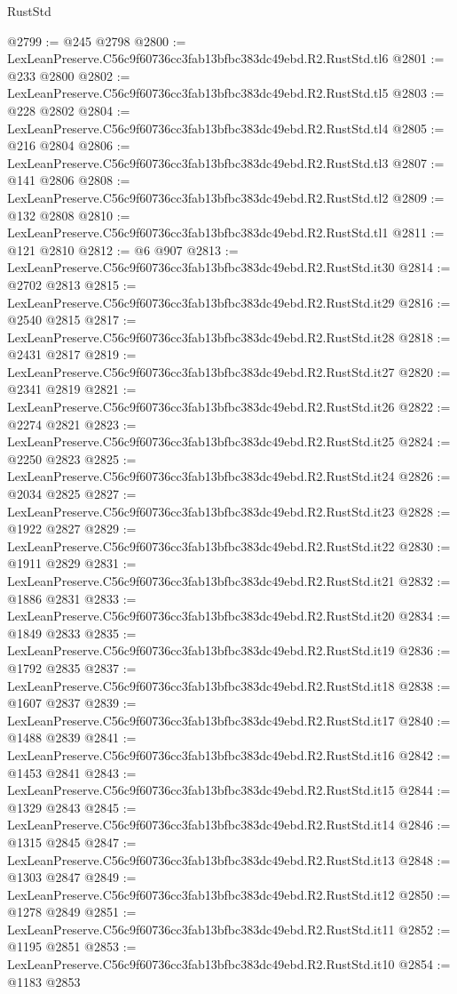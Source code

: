 \begin{lexlean}{RustStd}
\begin{coremodule}
@2799 := @245 @2798
@2800 := LexLeanPreserve.C56c9f60736cc3fab13bfbc383dc49ebd.R2.RustStd.tl6
@2801 := @233 @2800
@2802 := LexLeanPreserve.C56c9f60736cc3fab13bfbc383dc49ebd.R2.RustStd.tl5
@2803 := @228 @2802
@2804 := LexLeanPreserve.C56c9f60736cc3fab13bfbc383dc49ebd.R2.RustStd.tl4
@2805 := @216 @2804
@2806 := LexLeanPreserve.C56c9f60736cc3fab13bfbc383dc49ebd.R2.RustStd.tl3
@2807 := @141 @2806
@2808 := LexLeanPreserve.C56c9f60736cc3fab13bfbc383dc49ebd.R2.RustStd.tl2
@2809 := @132 @2808
@2810 := LexLeanPreserve.C56c9f60736cc3fab13bfbc383dc49ebd.R2.RustStd.tl1
@2811 := @121 @2810
@2812 := @6 @907
@2813 := LexLeanPreserve.C56c9f60736cc3fab13bfbc383dc49ebd.R2.RustStd.it30
@2814 := @2702 @2813
@2815 := LexLeanPreserve.C56c9f60736cc3fab13bfbc383dc49ebd.R2.RustStd.it29
@2816 := @2540 @2815
@2817 := LexLeanPreserve.C56c9f60736cc3fab13bfbc383dc49ebd.R2.RustStd.it28
@2818 := @2431 @2817
@2819 := LexLeanPreserve.C56c9f60736cc3fab13bfbc383dc49ebd.R2.RustStd.it27
@2820 := @2341 @2819
@2821 := LexLeanPreserve.C56c9f60736cc3fab13bfbc383dc49ebd.R2.RustStd.it26
@2822 := @2274 @2821
@2823 := LexLeanPreserve.C56c9f60736cc3fab13bfbc383dc49ebd.R2.RustStd.it25
@2824 := @2250 @2823
@2825 := LexLeanPreserve.C56c9f60736cc3fab13bfbc383dc49ebd.R2.RustStd.it24
@2826 := @2034 @2825
@2827 := LexLeanPreserve.C56c9f60736cc3fab13bfbc383dc49ebd.R2.RustStd.it23
@2828 := @1922 @2827
@2829 := LexLeanPreserve.C56c9f60736cc3fab13bfbc383dc49ebd.R2.RustStd.it22
@2830 := @1911 @2829
@2831 := LexLeanPreserve.C56c9f60736cc3fab13bfbc383dc49ebd.R2.RustStd.it21
@2832 := @1886 @2831
@2833 := LexLeanPreserve.C56c9f60736cc3fab13bfbc383dc49ebd.R2.RustStd.it20
@2834 := @1849 @2833
@2835 := LexLeanPreserve.C56c9f60736cc3fab13bfbc383dc49ebd.R2.RustStd.it19
@2836 := @1792 @2835
@2837 := LexLeanPreserve.C56c9f60736cc3fab13bfbc383dc49ebd.R2.RustStd.it18
@2838 := @1607 @2837
@2839 := LexLeanPreserve.C56c9f60736cc3fab13bfbc383dc49ebd.R2.RustStd.it17
@2840 := @1488 @2839
@2841 := LexLeanPreserve.C56c9f60736cc3fab13bfbc383dc49ebd.R2.RustStd.it16
@2842 := @1453 @2841
@2843 := LexLeanPreserve.C56c9f60736cc3fab13bfbc383dc49ebd.R2.RustStd.it15
@2844 := @1329 @2843
@2845 := LexLeanPreserve.C56c9f60736cc3fab13bfbc383dc49ebd.R2.RustStd.it14
@2846 := @1315 @2845
@2847 := LexLeanPreserve.C56c9f60736cc3fab13bfbc383dc49ebd.R2.RustStd.it13
@2848 := @1303 @2847
@2849 := LexLeanPreserve.C56c9f60736cc3fab13bfbc383dc49ebd.R2.RustStd.it12
@2850 := @1278 @2849
@2851 := LexLeanPreserve.C56c9f60736cc3fab13bfbc383dc49ebd.R2.RustStd.it11
@2852 := @1195 @2851
@2853 := LexLeanPreserve.C56c9f60736cc3fab13bfbc383dc49ebd.R2.RustStd.it10
@2854 := @1183 @2853

\end{coremodule}
\end{lexlean}
